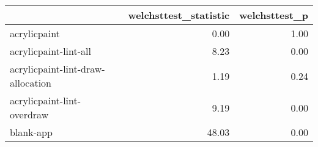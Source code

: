 \begin{tabular}{lrr}
\toprule
{} &  welchsttest\_statistic &  welchsttest\_p \\
\midrule
acrylicpaint                      &                   0.00 &           1.00 \\
acrylicpaint-lint-all             &                   8.23 &           0.00 \\
acrylicpaint-lint-draw-allocation &                   1.19 &           0.24 \\
acrylicpaint-lint-overdraw        &                   9.19 &           0.00 \\
blank-app                         &                  48.03 &           0.00 \\
\bottomrule
\end{tabular}
